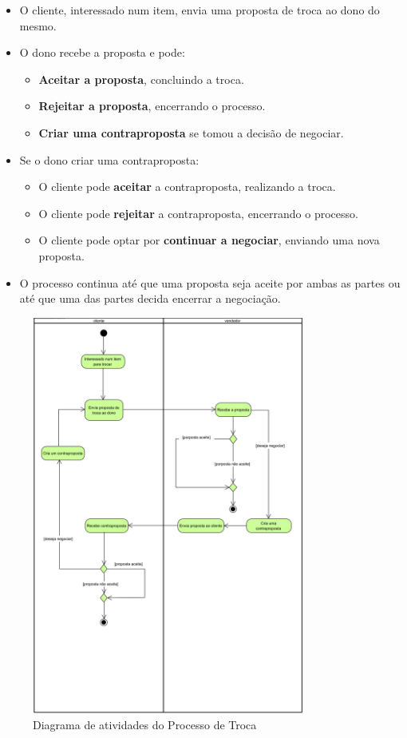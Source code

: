 \documentclass[a4paper, 12pt]{article} %
\begin{document}
\begin{itemize}

	\item O cliente, interessado num item, envia uma proposta de troca ao dono do mesmo.
	\item O dono recebe a proposta e pode:
	\begin{itemize}
		\item \textbf{Aceitar a proposta}, concluindo a troca.
		\item \textbf{Rejeitar a proposta}, encerrando o processo.
		\item \textbf{Criar uma contraproposta} se tomou a decisão de negociar.
	\end{itemize}
	\item Se o dono criar uma contraproposta:
	\begin{itemize}
		\item O cliente pode \textbf{aceitar} a contraproposta, realizando a troca.
		\item O cliente pode \textbf{rejeitar} a contraproposta, encerrando o processo.
		\item O cliente pode optar por \textbf{continuar a negociar}, enviando uma nova proposta.
	\end{itemize}
	\item O processo continua até que uma proposta seja aceite por ambas as partes ou até que uma das partes decida encerrar a negociação.
\end{itemize}

\begin{figure}[ht]
	\centering
	\includegraphics[width=0.8\textwidth]{../images/activity-diagram-swaps.png}
	\caption{Diagrama de atividades do Processo de Troca}
	\label{fig:diagrama_atividades_troca}
\end{figure}
\end{document}
